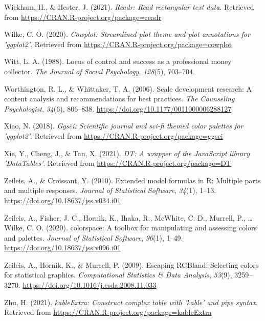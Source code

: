 \documentclass[
  english,
  man]{apa6}
\newlength{\cslhangindent}
\newlength{\cslentryspacingunit} %
\newenvironment{CSLReferences}[2] %
 {%
  \setlength{\parindent}{0pt}
  \ifodd #1
  \let\oldpar\par
  \def\par{\hangindent=\cslhangindent\oldpar}
  \fi
  \setlength{\parskip}{#2\cslentryspacingunit}
 }%
 {}
\begin{document}
\begin{CSLReferences}{1}{0}
\leavevmode{}%
Wickham, H., \& Hester, J. (2021). \emph{Readr: Read rectangular text data}. Retrieved from \url{https://CRAN.R-project.org/package=readr}

\leavevmode{}%
Wilke, C. O. (2020). \emph{Cowplot: Streamlined plot theme and plot annotations for 'ggplot2'}. Retrieved from \url{https://CRAN.R-project.org/package=cowplot}

\leavevmode{}%
Witt, L. A. (1988). Locus of control and success as a professional money collector. \emph{The Journal of Social Psychology}, \emph{128}(5), 703--704.

\leavevmode{}%
Worthington, R. L., \& Whittaker, T. A. (2006). Scale development research: A content analysis and recommendations for best practices. \emph{The Counseling Psychologist}, \emph{34}(6), 806--838. \url{https://doi.org/10.1177/0011000006288127}

\leavevmode{}%
Xiao, N. (2018). \emph{Ggsci: Scientific journal and sci-fi themed color palettes for 'ggplot2'}. Retrieved from \url{https://CRAN.R-project.org/package=ggsci}

\leavevmode{}%
Xie, Y., Cheng, J., \& Tan, X. (2021). \emph{DT: A wrapper of the JavaScript library 'DataTables'}. Retrieved from \url{https://CRAN.R-project.org/package=DT}

\leavevmode{}%
Zeileis, A., \& Croissant, Y. (2010). Extended model formulas in {R}: Multiple parts and multiple responses. \emph{Journal of Statistical Software}, \emph{34}(1), 1--13. \url{https://doi.org/10.18637/jss.v034.i01}

\leavevmode{}%
Zeileis, A., Fisher, J. C., Hornik, K., Ihaka, R., McWhite, C. D., Murrell, P., \ldots{} Wilke, C. O. (2020). {colorspace}: A toolbox for manipulating and assessing colors and palettes. \emph{Journal of Statistical Software}, \emph{96}(1), 1--49. \url{https://doi.org/10.18637/jss.v096.i01}

\leavevmode{}%
Zeileis, A., Hornik, K., \& Murrell, P. (2009). Escaping {RGB}land: Selecting colors for statistical graphics. \emph{Computational Statistics \& Data Analysis}, \emph{53}(9), 3259--3270. \url{https://doi.org/10.1016/j.csda.2008.11.033}

\leavevmode{}%
Zhu, H. (2021). \emph{kableExtra: Construct complex table with 'kable' and pipe syntax}. Retrieved from \url{https://CRAN.R-project.org/package=kableExtra}

\end{CSLReferences}

\endgroup
\end{document}
